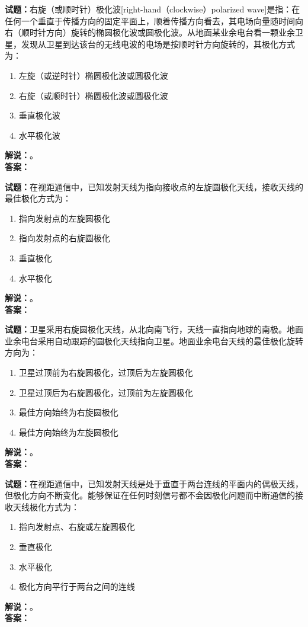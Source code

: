 \documentclass{ctexbook}
\begin{document}
\bigskip

\noindent\textbf{试题：}右旋（或顺时针）极化波[right-hand（clockwise）polarized wave]是指：在任何一个垂直于传播方向的固定平面上，顺着传播方向看去，其电场向量随时间向右（顺时针方向）旋转的椭圆极化波或圆极化波。从地面某业余电台看一颗业余卫星，发现从卫星到达该台的无线电波的电场是按顺时针方向旋转的，其极化方式为：
\begin{enumerate}[leftmargin=3em]
  \item 左旋（或逆时针）椭圆极化波或圆极化波
  \item 右旋（或顺时针）椭圆极化波或圆极化波
  \item 垂直极化波
  \item 水平极化波
\end{enumerate}
\noindent\textbf{解说：}\textbf{}。\\\noindent\textbf{答案：}

\bigskip

\noindent\textbf{试题：}在视距通信中，已知发射天线为指向接收点的左旋圆极化天线，接收天线的最佳极化方式为：
\begin{enumerate}[leftmargin=3em]
  \item 指向发射点的左旋圆极化
  \item 指向发射点的右旋圆极化
  \item 垂直极化
  \item 水平极化
\end{enumerate}
\noindent\textbf{解说：}\textbf{}。\\\noindent\textbf{答案：}

\bigskip

\noindent\textbf{试题：}卫星采用右旋圆极化天线，从北向南飞行，天线一直指向地球的南极。地面业余电台采用自动跟踪的圆极化天线指向卫星。地面业余电台天线的最佳极化旋转方向为：
\begin{enumerate}[leftmargin=3em]
  \item 卫星过顶前为右旋圆极化，过顶后为左旋圆极化
  \item 卫星过顶后为右旋圆极化，过顶前为左旋圆极化
  \item 最佳方向始终为右旋圆极化
  \item 最佳方向始终为左旋圆极化
\end{enumerate}
\noindent\textbf{解说：}\textbf{}。\\\noindent\textbf{答案：}

\bigskip

\noindent\textbf{试题：}在视距通信中，已知发射天线是处于垂直于两台连线的平面内的偶极天线，但极化方向不断变化。能够保证在任何时刻信号都不会因极化问题而中断通信的接收天线极化方式为：
\begin{enumerate}[leftmargin=3em]
  \item 指向发射点、右旋或左旋圆极化
  \item 垂直极化
  \item 水平极化
  \item 极化方向平行于两台之间的连线
\end{enumerate}
\noindent\textbf{解说：}\textbf{}。\\\noindent\textbf{答案：}
\end{document}
